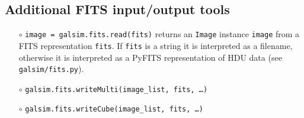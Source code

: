 \documentclass[preprint,11pt]{aastex}
\begin{document}
\subsection{Additional FITS input/output tools}\label{sect:multifits}

\begin{itemize}

\item[$\circ$] \texttt{image = galsim.fits.read(fits)} \newline
{returns an \texttt{Image} instance \texttt{image} from a FITS
  representation \texttt{fits}.  If \texttt{fits} is a string it is
  interpreted as a filename, otherwise it is interpreted as a PyFITS
  representation of HDU data (see
  \texttt{galsim/fits.py}).}
\item[$\circ$] \texttt{galsim.fits.writeMulti(image\_list, fits, \dots)}
\item[$\circ$] \texttt{galsim.fits.writeCube(image\_list, fits, \dots)}

\end{itemize}
\end{document}
